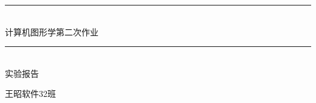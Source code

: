 \newcommand{\HRule}{\rule{\linewidth}{0.5mm}}
\begin{titlepage}
\begin{center}

\HRule \\[0.7cm]
{\huge 计算机图形学第二次作业} \\[0.2cm]
\HRule \\[1.2cm]

\textsc{\LARGE 实验报告} \\[6cm]

\begin{flushright}
\large 王\quad 昭\quad 软件32班\\
\end{flushright}

\end{center}
\end{titlepage}
